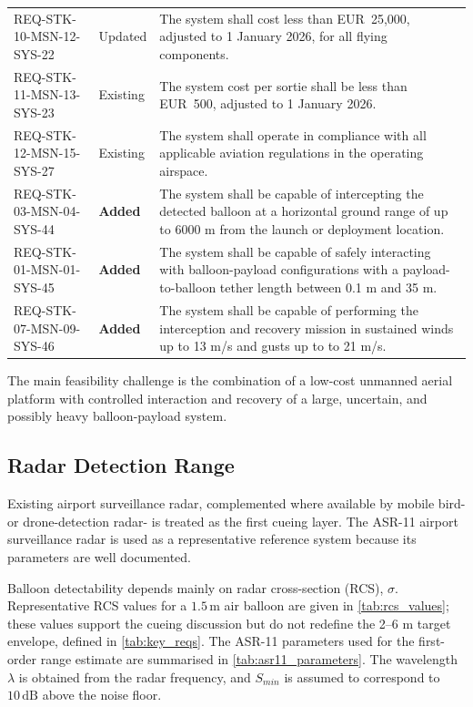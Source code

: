 \begin{xltabular}{\textwidth}{@{}p{0.28\textwidth} p{0.14\textwidth} X@{}}
\addlinespace
REQ-STK-10-MSN-12-SYS-22 &
Updated &
The system shall cost less than EUR~25,000, adjusted to
1 January 2026, for all flying components. \\

\addlinespace
REQ-STK-11-MSN-13-SYS-23 &
Existing &
The system cost per sortie shall be less than EUR~500, adjusted to
1 January 2026. \\

\addlinespace
REQ-STK-12-MSN-15-SYS-27 &
Existing &
The system shall operate in compliance with all applicable
aviation regulations in the operating airspace. \\

\addlinespace
REQ-STK-03-MSN-04-SYS-44 &
\textbf{Added} &
The system shall be capable of intercepting the detected
balloon at a horizontal ground range of up to 6000 m from the
launch or deployment location. \\

\addlinespace
REQ-STK-01-MSN-01-SYS-45 &
\textbf{Added} &
The system shall be capable of safely interacting with balloon-payload configurations with a payload-to-balloon tether length between 0.1 m and 35 m. \\

\addlinespace
REQ-STK-07-MSN-09-SYS-46 &
\textbf{Added} &
The system shall be capable of performing the interception and
recovery mission in sustained winds up to 13 m/s and gusts up to
to 21 m/s. \\
\end{xltabular}
\endgroup




\noindent The main feasibility challenge is the combination of
a low-cost unmanned aerial platform with controlled interaction
and recovery of a large, uncertain, and possibly heavy
balloon-payload system.


\subsection*{Radar Detection Range}
Existing airport surveillance radar, complemented where available by
mobile bird- or drone-detection radar- is treated as the first cueing
layer. The ASR-11 airport surveillance radar is used as a
representative reference system because its parameters are well
documented.

Balloon detectability depends mainly on radar cross-section (RCS), $\sigma$.
Representative RCS values for a $1.5\,\text{m}$ air balloon are given
in \autoref{tab:rcs_values}; these values support the cueing discussion
    but do not redefine the 2--6 m target envelope, defined in
\autoref{tab:key_reqs}. The ASR-11 parameters used for the first-order
range estimate are summarised in \autoref{tab:asr11_parameters}. The
wavelength $\lambda$ is obtained from the radar frequency, and
$S_{min}$ is assumed to correspond to $10\,\text{dB}$ above the noise
floor.

